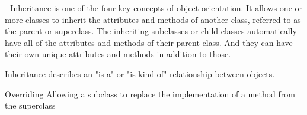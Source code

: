 - Inheritance is one of the four key concepts of object orientation.
It allows one or more classes to inherit the attributes and methods of another class, referred to as the parent or superclass.
The inheriting subclasses or child classes automatically have all of the attributes and methods of their parent class.
And they can have their own unique attributes and methods in addition to those. 

Inheritance describes an "is a" or "is kind of" relationship between objects.

Overriding 
  Allowing a subclass to replace the implementation of a method from the superclass 